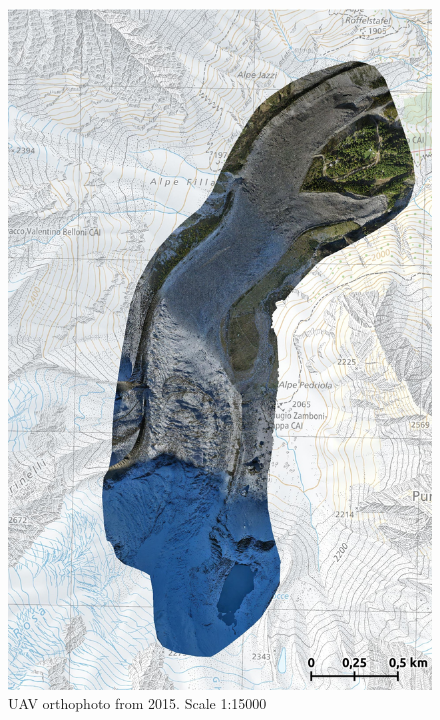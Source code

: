 \begin{figure}[p]
    \centering
    \includegraphics[width=\textwidth]{figures/appendix/orto_2015.jpg}
    \caption{UAV orthophoto from 2015. Scale 1:15000}
\end{figure}

